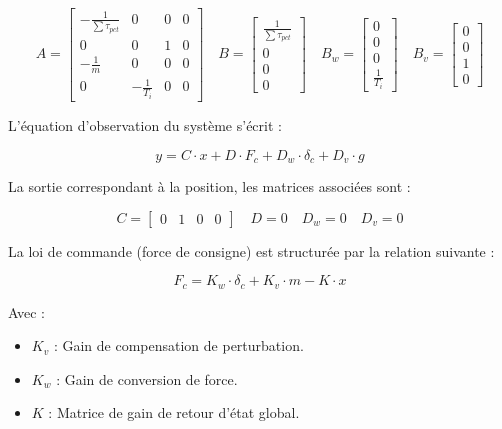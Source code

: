 \begin{equation}
    A = \begin{bmatrix} -\frac{1}{\sum\tau_{pct}} & 0 & 0 & 0 \\ 0 & 0 & 1 & 0 \\ -\frac{1}{m} & 0 & 0 & 0 \\ 0 & -\frac{1}{T_i} & 0 & 0 \end{bmatrix} \quad B = \begin{bmatrix} \frac{1}{\sum\tau_{pct}} \\ 0 \\ 0 \\ 0 \end{bmatrix}\quad B_w = \begin{bmatrix} 0 \\ 0 \\ 0 \\ \frac{1}{T_i} \end{bmatrix}\quad B_v = \begin{bmatrix} 0 \\ 0 \\ 1 \\ 0 \end{bmatrix}
\end{equation}

L'équation d'observation du système s'écrit :

\begin{equation}
    y = C \cdot x + D \cdot F_c + D_w \cdot \delta_c + D_v \cdot g
\end{equation}

La sortie correspondant à la position, les matrices associées sont :

\begin{equation}
    C = \begin{bmatrix} 0 & 1 & 0 & 0 \end{bmatrix}\quad D = 0\quad D_w = 0 \quad D_v = 0
\end{equation}

La loi de commande (force de consigne) est structurée par la relation suivante :

\begin{equation}
    F_c = K_w \cdot \delta_c + K_v \cdot m - K \cdot x
\end{equation}

Avec :
\begin{itemize}
    \item $K_v$ : Gain de compensation de perturbation.
    \item $K_w$ : Gain de conversion de force.
    \item $K$ : Matrice de gain de retour d'état global.
\end{itemize}

